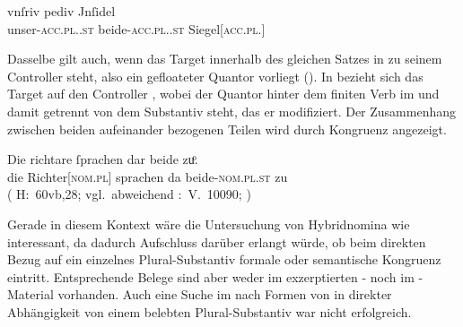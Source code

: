 \begin{exe}
\ex \label{ex:gendassgmt1_txt}
	\gll vnſriv pediv Jnſidel \\
		unser-\textsc{acc.pl.\NeutI.st} beide-\textsc{acc.pl.\NeutI.st}
			Siegel[\textsc{acc.pl.\NeutI}] \\
	\trans {}
		\parencites(Nr.~3224~A, Freising, 1299)[400,12--13]{cao4}
\end{exe}


Dasselbe gilt auch, wenn das Target innerhalb des gleichen Satzes in
 zu seinem Controller steht, also ein
gefloateter Quantor vorliegt (). In
 bezieht sich das Target  auf den Controller
 , wobei der Quantor hinter dem finiten Verb im
 und damit getrennt von dem Substantiv steht, das er
modifiziert. Der Zusammenhang zwischen beiden aufeinander bezogenen Teilen wird
durch Kongruenz angezeigt.

\begin{exe}
\ex \label{ex:gendassgmt2}
	\gll Die richtare ſprachen dar beide zuͦ. \\
		die Richter[\textsc{nom.pl\subM}] sprachen da
		beide-\textsc{nom.pl\subM.st} zu \\
	\trans {}
		(%
			H:~60vb,28; vgl.~abweichend
			\KC:~V.~10090;
			\cite[267]{schroeder1895}%
		)
\end{exe}

Gerade in diesem Kontext wäre die Untersuchung von Hybridnomina
wie   interessant, da dadurch
Aufschluss darüber erlangt würde, ob beim direkten Bezug auf ein einzelnes
Plural-Substantiv formale oder semantische
Kongruenz eintritt. Entsprechende Belege sind aber
weder im exzerptierten \CAO{}- noch im \KC{}-Material vorhanden. Auch eine
Suche im \REM{} nach Formen von  in direkter Abhängigkeit von einem
belebten Plural-Substantiv war nicht erfolgreich.

